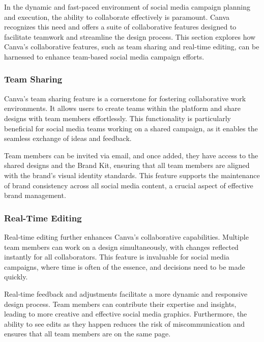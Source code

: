 \documentclass[
]{book}
\begin{document}
In the dynamic and fast-paced environment of social media campaign planning and execution, the ability to collaborate effectively is paramount. Canva recognizes this need and offers a suite of collaborative features designed to facilitate teamwork and streamline the design process. This section explores how Canva's collaborative features, such as team sharing and real-time editing, can be harnessed to enhance team-based social media campaign efforts.

\hypertarget{team-sharing}{%
\subsubsection*{Team Sharing}\label{team-sharing}}

Canva's team sharing feature is a cornerstone for fostering collaborative work environments. It allows users to create teams within the platform and share designs with team members effortlessly. This functionality is particularly beneficial for social media teams working on a shared campaign, as it enables the seamless exchange of ideas and feedback.

Team members can be invited via email, and once added, they have access to the shared designs and the Brand Kit, ensuring that all team members are aligned with the brand's visual identity standards. This feature supports the maintenance of brand consistency across all social media content, a crucial aspect of effective brand management.

\hypertarget{real-time-editing}{%
\subsubsection*{Real-Time Editing}\label{real-time-editing}}

Real-time editing further enhances Canva's collaborative capabilities. Multiple team members can work on a design simultaneously, with changes reflected instantly for all collaborators. This feature is invaluable for social media campaigns, where time is often of the essence, and decisions need to be made quickly.

Real-time feedback and adjustments facilitate a more dynamic and responsive design process. Team members can contribute their expertise and insights, leading to more creative and effective social media graphics. Furthermore, the ability to see edits as they happen reduces the risk of miscommunication and ensures that all team members are on the same page.
\end{document}
